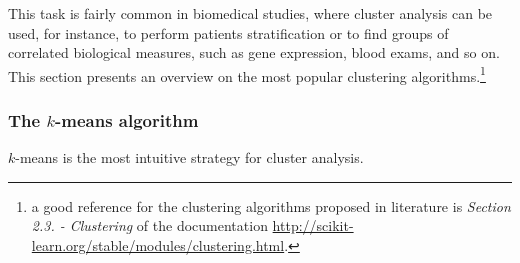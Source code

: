     This task is fairly common in biomedical studies, where cluster analysis can be used, for instance, to perform patients stratification or to find groups of correlated biological measures, such as gene expression, blood exams, and so on. This section presents an overview on the most popular clustering algorithms.\footnote{a good reference for the clustering algorithms proposed in literature is \textit{Section 2.3. - Clustering} of the \sklearn documentation \url{http://scikit-learn.org/stable/modules/clustering.html}.}

    \subsubsection{The $k$-means algorithm} \label{sec:k-means}
    $k$-means is the most intuitive strategy for cluster analysis.
    
